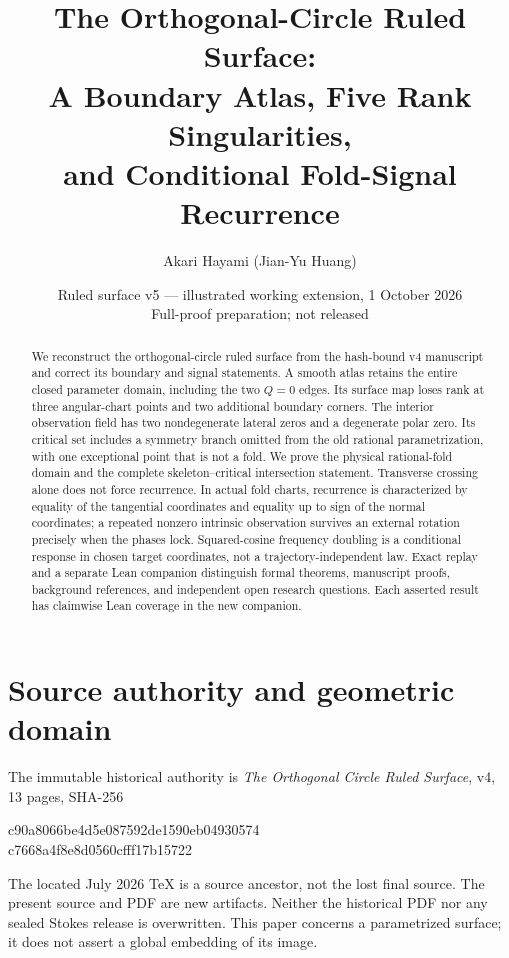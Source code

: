 \documentclass[11pt,a4paper]{article}
\title{The Orthogonal-Circle Ruled Surface:\\A Boundary Atlas, Five Rank Singularities,\\and Conditional Fold-Signal Recurrence}
\author{Akari Hayami (Jian-Yu Huang)}
\date{Ruled surface v5 --- illustrated working extension, 1 October 2026\\Full-proof preparation; not released}
\theoremstyle{definition}\newtheorem{definition}[theorem]{Definition}
\theoremstyle{remark}\newtheorem{remark}[theorem]{Remark}
\begin{document}
\maketitle
\begin{abstract}
We reconstruct the orthogonal-circle ruled surface from the hash-bound v4
manuscript and correct its boundary and signal statements. A smooth atlas
retains the entire closed parameter domain, including the two $Q=0$ edges.
Its surface map loses rank at three angular-chart points and two additional
boundary corners. The interior observation field has two nondegenerate
lateral zeros and a degenerate polar zero. Its critical set includes a
symmetry branch omitted from the old rational parametrization, with one
exceptional point that is not a fold. We prove the physical rational-fold
domain and the complete skeleton--critical intersection statement.
Transverse crossing alone does not force recurrence. In actual fold charts,
recurrence is characterized by equality of the tangential coordinates and
equality up to sign of the normal coordinates; a repeated nonzero intrinsic
observation survives an external rotation precisely when the phases lock.
Squared-cosine frequency doubling is a conditional response in chosen target
coordinates, not a trajectory-independent law. Exact replay and a separate
Lean companion distinguish formal theorems, manuscript proofs, background
references, and independent open research questions. Each asserted result
has claimwise Lean coverage in the new companion.
\end{abstract}
\tableofcontents

\section{Source authority and geometric domain}
The immutable historical authority is \emph{The Orthogonal Circle Ruled
Surface}, v4, 13 pages, SHA-256
\begin{center}\small\ttfamily
c90a8066be4d5e087592de1590eb04930574\\
c7668a4f8e8d0560cfff17b15722
\end{center}
The located July 2026 TeX is a source ancestor, not the lost final source.
The present source and PDF are new artifacts. Neither the historical PDF
nor any sealed Stokes release is overwritten. This paper concerns a
parametrized surface; it does not assert a global embedding of its image.
\end{document}
